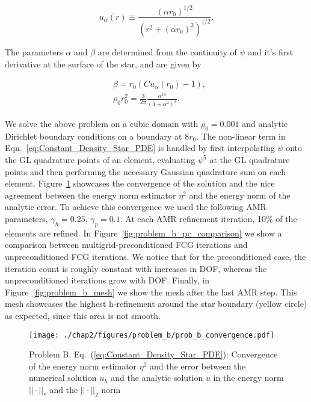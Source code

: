 \begin{equation}
u_{\alpha}(r) \equiv \frac{(\alpha r_0)^{1/2}}{(r^{2} + (\alpha r_0)^{2})^{1/2}}.
\end{equation}

The parameters $\alpha$ and $\beta$ are determined from the continuity of $\psi$ and it's first derivative at the surface of the star, and are given by

\begin{align}
 &\beta = r_0(Cu_{\alpha}(r_0) - 1), \\
 &\rho_{0}r_0^{2} = \frac{3}{2\pi}\frac{\alpha^{10}}{(1+\alpha^{2})^{3}}.
\end{align}

We solve the above problem on a cubic domain with $\rho_0 =
0.001$ and analytic Dirichlet boundary conditions on a boundary at
$8r_0$. The non-linear term in Eqn.~\ref{eq:Constant_Density_Star_PDE} is handled by first interpolating $\psi$ onto the GL quadrature points of an element, evaluating $\psi^{5}$ at the GL quadrature points and then performing the necessary Gaussian quadrature sum on each element.
Figure~\ref{fig:problem_b_convergence} showcases the
convergence of the solution and the nice agreement between the
energy norm estimator $\eta^2$ and the energy norm of the analytic
error. To achieve this convergence we used the following AMR parameters, $\gamma_h = 0.25$, $\gamma_p = 0.1$.  At each AMR refinement iteration, 10\% of the elements are refined. In Figure~\ref{fig:problem_b_pc_comparison} we show a comparison between multigrid-preconditioned FCG iterations and unpreconditioned FCG iterations. We notice that for the preconditioned case, the iteration count is roughly constant with increases in DOF, whereas the unpreconditioned iterations grow with DOF. Finally, in Figure~\ref{fig:problem_b_mesh} we show the mesh after the last AMR step. This mesh showcases the highest h-refinement around the star boundary (yellow circle) as expected, since this area is not smooth. 
 
\begin{figure}[ht!]
  \centering
  \texttt{[image: ./chap2/figures/problem\_b/prob\_b\_convergence.pdf]}
  \caption{Problem B, Eq.~(\ref{eq:Constant_Density_Star_PDE}): Convergence of the energy norm estimator $\eta^2$ and the error between the numerical solution $u_h$ and the analytic solution $u$ in the energy norm $||\cdot||_*$ and the $||\cdot||_2$ norm}
  \label{fig:problem_b_convergence} 
\end{figure}


